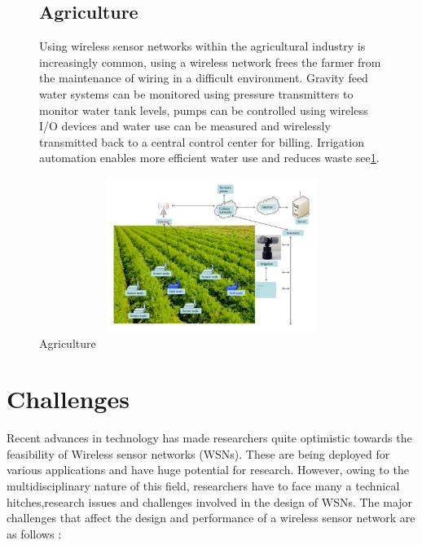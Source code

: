    \begin{figure} 
    \subsection{Agriculture}
    
    Using wireless sensor networks within the agricultural industry  is  increasingly  common,  using  a  wireless  network frees the farmer from the maintenance of wiring in a difficult environment. Gravity  feed  water  systems  can  be  monitored using  pressure  transmitters  to  monitor  water  tank  levels, pumps can be controlled using wireless I/O devices and water use  can  be  measured  and  wirelessly  transmitted  back  to  a central  control  center  for  billing.  Irrigation  automation enables more efficient water use and reduces waste\cite{application} see\ref{fig:x Agriculture_}.
    
		

	\hfill
	\includegraphics[scale=0.5,width=12cm,height=5cm]{photos/agri.png}
	\caption{Agriculture}
	\centering
	\label{fig:x Agriculture_}
	\hspace*{\fill}
\end{figure}
\section{Challenges}

Recent advances in technology has made researchers quite optimistic towards the feasibility of Wireless sensor networks (WSNs).  These are being deployed for various applications and have huge potential for research. However, owing to the multidisciplinary nature of this field, researchers have to face many a technical hitches,research issues and challenges involved in the design of WSNs\cite{resGateChallenges}. 
The major challenges that affect the design and performance of a wireless sensor network are as follows :
